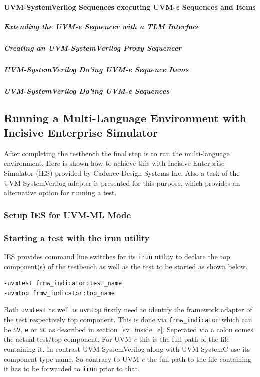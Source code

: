 \paragraph{UVM-SystemVerilog Sequences executing UVM-\textit{e} Sequences and Items}
\subparagraph{Extending the UVM-\textit{e} Sequencer with a TLM Interface}
\subparagraph{Creating an UVM-SystemVerilog Proxy Sequencer}
\subparagraph{UVM-SystemVerilog Do'ing UVM-\textit{e} Sequence Items}
\subparagraph{UVM-SystemVerilog Do'ing UVM-\textit{e} Sequences}
\subsection{Running a Multi-Language Environment with Incisive Enterprise Simulator}

After completing the testbench the final step is to run the multi-language environment. Here is shown how to achieve
this with Incisive Enterprise Simulator (IES) provided by Cadence Design Systems Inc. Also a task of the
UVM-SystemVerilog adapter is presented for this purpose, which provides an alternative option for running a test.

\subsubsection{Setup IES for UVM-ML Mode}
\subsubsection{Starting a test with the irun utility} \label{uvm_top}

IES provides command line switches for its \lstinline$irun$ utility to declare the top component(s) of the testbench as
well as the test to be started as shown below.
\medskip
{}
\begin{lstlisting}
-uvmtest frmw_indicator:test_name
-uvmtop frmw_indicator:top_name
\end{lstlisting} 
\medskip
Both \lstinline$uvmtest$ as well as \lstinline$uvmtop$ firstly need to identify the framework adapter of the test
respectively top component. This is done via \lstinline$frmw_indicator$ which can be \lstinline$SV$, \lstinline$e$ or
\lstinline$SC$ as described in section~\ref{sv_inside_e}. Seperated via a colon comes the actual test/top component. For
UVM-\textit{e} this is the full path of the file containing it. In contrast UVM-SystemVerilog along with UVM-SystemC use
its component type name. So contrary to UVM-\textit{e} the full path to the file containing it has to be forwarded to
\lstinline$irun$ prior to that.

